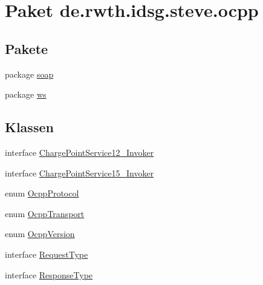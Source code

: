 \hypertarget{namespacede_1_1rwth_1_1idsg_1_1steve_1_1ocpp}{\section{Paket de.\-rwth.\-idsg.\-steve.\-ocpp}
\label{namespacede_1_1rwth_1_1idsg_1_1steve_1_1ocpp}
}
\subsection*{Pakete}
\begin{DoxyCompactItemize}
\item 
package \hyperlink{namespacede_1_1rwth_1_1idsg_1_1steve_1_1ocpp_1_1soap}{soap}
\item 
package \hyperlink{namespacede_1_1rwth_1_1idsg_1_1steve_1_1ocpp_1_1ws}{ws}
\end{DoxyCompactItemize}
\subsection*{Klassen}
\begin{DoxyCompactItemize}
\item 
interface \hyperlink{interfacede_1_1rwth_1_1idsg_1_1steve_1_1ocpp_1_1_charge_point_service12___invoker}{Charge\-Point\-Service12\-\_\-\-Invoker}
\item 
interface \hyperlink{interfacede_1_1rwth_1_1idsg_1_1steve_1_1ocpp_1_1_charge_point_service15___invoker}{Charge\-Point\-Service15\-\_\-\-Invoker}
\item 
enum \hyperlink{enumde_1_1rwth_1_1idsg_1_1steve_1_1ocpp_1_1_ocpp_protocol}{Ocpp\-Protocol}
\item 
enum \hyperlink{enumde_1_1rwth_1_1idsg_1_1steve_1_1ocpp_1_1_ocpp_transport}{Ocpp\-Transport}
\item 
enum \hyperlink{enumde_1_1rwth_1_1idsg_1_1steve_1_1ocpp_1_1_ocpp_version}{Ocpp\-Version}
\item 
interface \hyperlink{interfacede_1_1rwth_1_1idsg_1_1steve_1_1ocpp_1_1_request_type}{Request\-Type}
\item 
interface \hyperlink{interfacede_1_1rwth_1_1idsg_1_1steve_1_1ocpp_1_1_response_type}{Response\-Type}
\end{DoxyCompactItemize}
